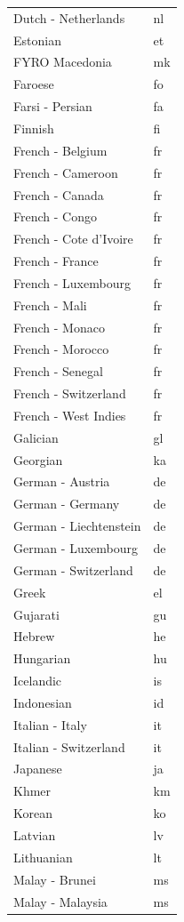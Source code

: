 \documentclass[
  12pt,
]{krantz}
\begin{document}
\begin{longtable}{ll}
\addlinespace
Dutch - Netherlands & nl\\
Estonian & et\\
FYRO Macedonia & mk\\
Faroese & fo\\
Farsi - Persian & fa\\
\addlinespace
Finnish & fi\\
French - Belgium & fr\\
French - Cameroon & fr\\
French - Canada & fr\\
French - Congo & fr\\
\addlinespace
French - Cote d'Ivoire & fr\\
French - France & fr\\
French - Luxembourg & fr\\
French - Mali & fr\\
French - Monaco & fr\\
\addlinespace
French - Morocco & fr\\
French - Senegal & fr\\
French - Switzerland & fr\\
French - West Indies & fr\\
Galician & gl\\
\addlinespace
Georgian & ka\\
German - Austria & de\\
German - Germany & de\\
German - Liechtenstein & de\\
German - Luxembourg & de\\
\addlinespace
German - Switzerland & de\\
Greek & el\\
Gujarati & gu\\
Hebrew & he\\
Hungarian & hu\\
\addlinespace
Icelandic & is\\
Indonesian & id\\
Italian - Italy & it\\
Italian - Switzerland & it\\
Japanese & ja\\
\addlinespace
Khmer & km\\
Korean & ko\\
Latvian & lv\\
Lithuanian & lt\\
Malay - Brunei & ms\\
\addlinespace
Malay - Malaysia & ms\\

\end{longtable}
\end{document}
